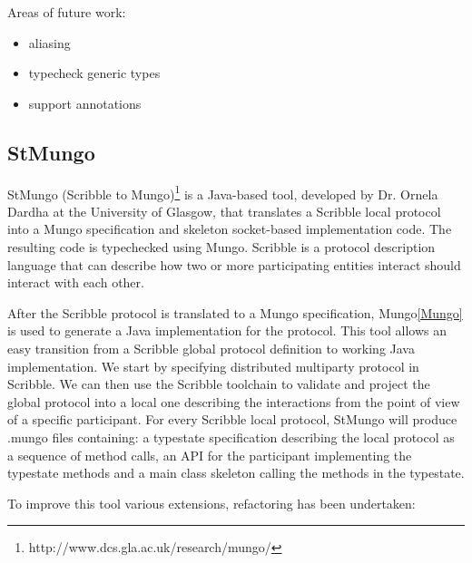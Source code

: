 Areas of future work:
\begin{itemize}
  \item aliasing
  \item typecheck generic types
  \item support annotations
\end{itemize}

\subsection{StMungo}
\label{sub:StMungo}

StMungo (Scribble to Mungo)\footnote{http://www.dcs.gla.ac.uk/research/mungo/} is a Java-based tool, developed by Dr. Ornela Dardha at the University of Glasgow, that translates a Scribble\cite{scribble, YHNN2013} local protocol into a Mungo specification and skeleton socket-based implementation code. The resulting code is typechecked using Mungo. Scribble is a protocol description language that can describe how two or more participating entities interact should interact with each other. 



After the Scribble protocol is translated to a Mungo specification, Mungo\ref{Mungo} is used to generate a Java implementation for the protocol. This tool allows an easy transition from a Scribble global protocol definition to working Java implementation. We start by specifying distributed multiparty protocol in Scribble. We can then use the Scribble toolchain to validate and project the global protocol into a local one describing the interactions from the point of view of a specific participant. For every Scribble local protocol, StMungo will produce .mungo files containing: a typestate specification describing the local protocol as a sequence of method calls, an API for the participant implementing the typestate methods and a main class skeleton calling the methods in the typestate.

To improve this tool various extensions, refactoring has been undertaken:

